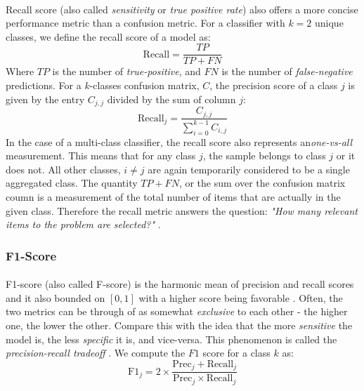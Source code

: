 \documentclass[12pt,letterpaper]{article}
\begin{document}
\paragraph*{}Recall score (also called \textit{sensitivity} or \textit{true positive rate}) also offers a more concise performance metric than a confusion metric. For a classifier with $k = 2$ unique classes, we define the recall score of a model as:
\begin{equation}
\label{eqn-BinaryRecall}
\text{Recall} = \frac{TP}{TP + FN}
\end{equation}
Where $TP$ is the number of \textit{true-positive}, and $FN$ is the number of \textit{false-negative} predictions. For a $k$-classes confusion matrix, $C$, the precision score of a class $j$ is given by the entry $C_{j,j}$ divided by the sum of column $j$:
\begin{equation}
\label{eqn-KRecall}
\text{Recall}_j = \frac{C_{j,j}}{\sum_{i=0}^{k-1}C_{i,j}}
\end{equation}
In the case of a multi-class classifier, the recall score also represents an\textit{one-vs-all} measurement. This means that for any class $j$, the sample belongs to class $j$ or it does not. All other classes, $i \neq j$ are again temporarily considered to be a single aggregated class. The quantity $TP + FN$, or the sum over the confusion matrix coumn is a measurement of the total number of items that are actually in the given class. Therefore the recall metric answers the question: \textit{"How many relevant items to the problem are selected?"} \cite{Geron,James}.


\subsubsection{F1-Score}

\paragraph*{}F1-score (also called F-score) is the harmonic mean of precision and recall scores and it also bounded on $[0,1]$ with a higher score being favorable \cite{Geron}. Often, the two metrics can be through of as somewhat \textit{exclusive} to each other - the higher one, the lower the other. Compare this with the idea that the more \textit{sensitive} the model is, the less \textit{specific} it is, and vice-versa. This phenomenon is called the \textit{precision-recall tradeoff} \cite{Geron,James}. We compute the $F1$ score for a class $k$ as:
\begin{equation}
\label{eqn-F1Score}
\text{F1}_{j} = 2 \times \frac{\text{Prec}_j + \text{Recall}_j}{\text{Prec}_j \times \text{Recall}_j}
\end{equation}
\end{document}
